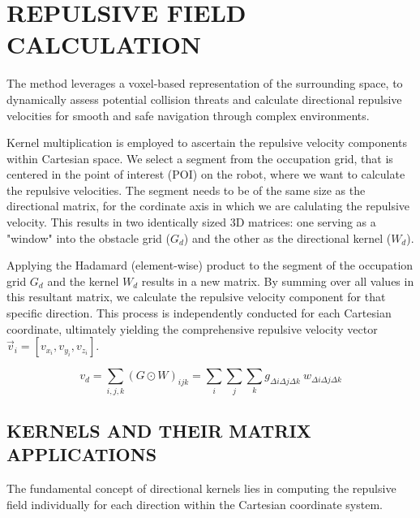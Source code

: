 \documentclass[letterpaper, 10 pt, conference]{ieeeconf}  %
\begin{document}
\section{REPULSIVE FIELD CALCULATION}
\label{section:repulsive_vel}

The method leverages a voxel-based representation of the surrounding space, to dynamically assess potential collision threats and calculate directional repulsive velocities for smooth and safe navigation through complex environments. 

Kernel multiplication is employed to ascertain the repulsive velocity components within Cartesian space. We select a segment from the occupation grid, that is centered in the point of interest (POI) on the robot, where we want to calculate the repulsive velocities. The segment needs to be of the same size as the directional matrix, for the cordinate axis in which we are calulating the repulsive velocity. This results in two identically sized 3D matrices: one serving as a "window" into the obstacle grid (\(G_d\)) and the other as the directional kernel (\(W_d\)).

Applying the Hadamard (element-wise) product to the segment of the occupation grid \(G_d\) and the kernel \(W_d\) results in a new matrix. By summing over all values in this resultant matrix, we calculate the repulsive velocity component for that specific direction. This process is independently conducted for each Cartesian coordinate, ultimately yielding the comprehensive repulsive velocity vector \(\vec{v}_i = [ v_{x_i}, v_{y_i}, v_{z_i}]\).

\begin{equation}
	v_d = \sum_{i,j,k} (G \odot W)_{ijk} = \sum_{i}\sum_{j}\sum_{k} g_{\Delta i \Delta j \Delta k} ~  w_{\Delta i \Delta j \Delta k}
	\label{eq:matrix-product}
\end{equation}


\subsection{KERNELS AND THEIR MATRIX APPLICATIONS}

The fundamental concept of directional kernels lies in computing the repulsive field individually for each direction within the Cartesian coordinate system. 
\end{document}
